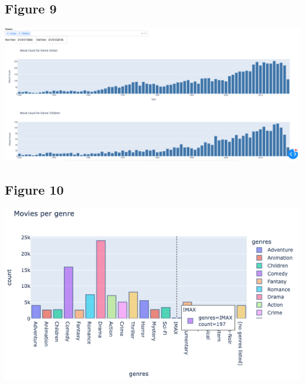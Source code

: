 \documentclass{article}
\begin{document}
\subsection{Figure 9}
\includegraphics[width=1\textwidth]{img/dashboard_plotly.png}

\subsection{Figure 10}
\includegraphics[width=1\textwidth]{img/fitts_hover.png}
\end{document}
